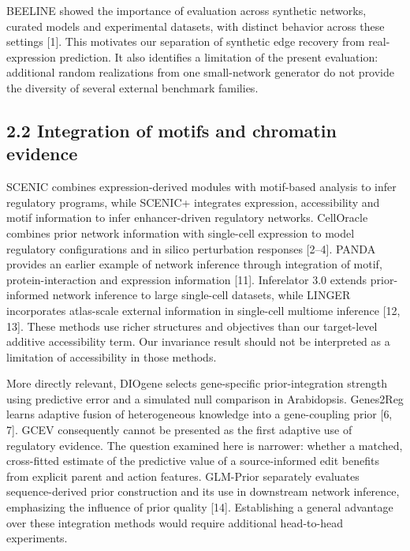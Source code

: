 \documentclass[
  11pt,
]{article}
\begin{document}
BEELINE showed the importance of evaluation across synthetic networks,
curated models and experimental datasets, with distinct behavior across
these settings {[}1{]}. This motivates our separation of synthetic edge
recovery from real-expression prediction. It also identifies a
limitation of the present evaluation: additional random realizations
from one small-network generator do not provide the diversity of several
external benchmark families.

\subsection{2.2 Integration of motifs and chromatin
evidence}\label{integration-of-motifs-and-chromatin-evidence}

SCENIC combines expression-derived modules with motif-based analysis to
infer regulatory programs, while SCENIC+ integrates expression,
accessibility and motif information to infer enhancer-driven regulatory
networks. CellOracle combines prior network information with single-cell
expression to model regulatory configurations and in silico perturbation
responses {[}2--4{]}. PANDA provides an earlier example of network
inference through integration of motif, protein-interaction and
expression information {[}11{]}. Inferelator 3.0 extends prior-informed
network inference to large single-cell datasets, while LINGER
incorporates atlas-scale external information in single-cell multiome
inference {[}12, 13{]}. These methods use richer structures and
objectives than our target-level additive accessibility term. Our
invariance result should not be interpreted as a limitation of
accessibility in those methods.

More directly relevant, DIOgene selects gene-specific prior-integration
strength using predictive error and a simulated null comparison in
Arabidopsis. Genes2Reg learns adaptive fusion of heterogeneous knowledge
into a gene-coupling prior {[}6, 7{]}. GCEV consequently cannot be
presented as the first adaptive use of regulatory evidence. The question
examined here is narrower: whether a matched, cross-fitted estimate of
the predictive value of a source-informed edit benefits from explicit
parent and action features. GLM-Prior separately evaluates
sequence-derived prior construction and its use in downstream network
inference, emphasizing the influence of prior quality {[}14{]}.
Establishing a general advantage over these integration methods would
require additional head-to-head experiments.
\end{document}
